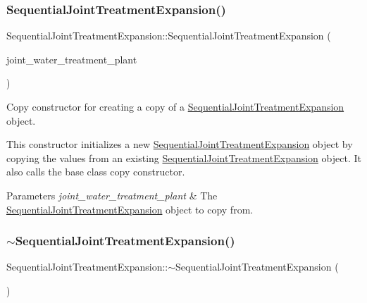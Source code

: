 \subsubsection{\texorpdfstring{Sequential\+Joint\+Treatment\+Expansion()}{SequentialJointTreatmentExpansion()}\hspace{0.1cm}{\footnotesize\ttfamily [2/2]}}
{\footnotesize\ttfamily Sequential\+Joint\+Treatment\+Expansion\+::\+Sequential\+Joint\+Treatment\+Expansion (\begin{DoxyParamCaption}\item[{const \mbox{\hyperlink{classSequentialJointTreatmentExpansion}{Sequential\+Joint\+Treatment\+Expansion}} \&}]{joint\+\_\+water\+\_\+treatment\+\_\+plant }\end{DoxyParamCaption})}



Copy constructor for creating a copy of a \mbox{\hyperlink{classSequentialJointTreatmentExpansion}{Sequential\+Joint\+Treatment\+Expansion}} object. 

This constructor initializes a new {\ttfamily \mbox{\hyperlink{classSequentialJointTreatmentExpansion}{Sequential\+Joint\+Treatment\+Expansion}}} object by copying the values from an existing {\ttfamily \mbox{\hyperlink{classSequentialJointTreatmentExpansion}{Sequential\+Joint\+Treatment\+Expansion}}} object. It also calls the base class copy constructor.


\begin{DoxyParams}{Parameters}
{\em joint\+\_\+water\+\_\+treatment\+\_\+plant} & The {\ttfamily \mbox{\hyperlink{classSequentialJointTreatmentExpansion}{Sequential\+Joint\+Treatment\+Expansion}}} object to copy from. \\
\hline
\end{DoxyParams}
\mbox{\label{classSequentialJointTreatmentExpansion_a77d4270fd89d172739fdede5b9e6c1e9}} 
\subsubsection{\texorpdfstring{$\sim$\+Sequential\+Joint\+Treatment\+Expansion()}{~SequentialJointTreatmentExpansion()}}
{\footnotesize\ttfamily Sequential\+Joint\+Treatment\+Expansion\+::$\sim$\+Sequential\+Joint\+Treatment\+Expansion (\begin{DoxyParamCaption}{ }\end{DoxyParamCaption})\hspace{0.3cm}{\ttfamily [override]}}



